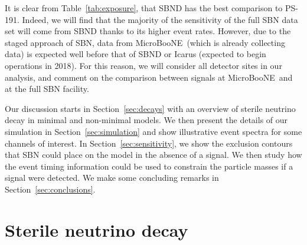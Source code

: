 \documentclass[11pt, a4paper]{article}
\newcommand{\refsec}[1]{Section~\ref{#1}}
\newcommand{\reftab}[1]{Table~\ref{#1}}
\def\muboone{MicroBooNE}
\begin{document}
It is clear from \reftab{tab:exposure}, that SBND has the best comparison to
PS-191.  Indeed, we will find that the majority of the sensitivity of the full
SBN data set will come from SBND thanks to its higher event rates. However, due
to the staged approach of SBN, data from \muboone\ (which is already collecting
data) is expected well before that of SBND or Icarus (expected to begin
operations in 2018). For this reason, we will consider all detector sites in
our analysis, and comment on the comparison between signals at \muboone\ and at
the full SBN facility.

Our discussion starts in \refsec{sec:decays} with an overview of sterile
neutrino decay in minimal and non-minimal models. We then present the details
of our simulation in \refsec{sec:simulation} and show illustrative event
spectra for some channels of interest. In \refsec{sec:sensitivity}, we show the
exclusion contours that SBN could place on the model in the absence of a
signal. We then study how the event timing information could be used to
constrain the particle masses if a signal were detected. We make some
concluding remarks in \refsec{sec:conclusions}.

\section{\label{sec:decays}Sterile neutrino decay}
\end{document}
